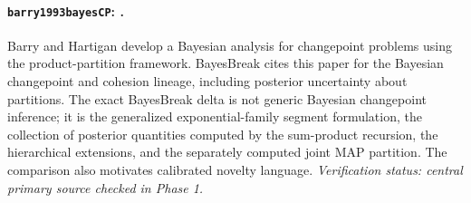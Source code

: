 
\paragraph{\texttt{barry1993bayesCP}: \citet{barry1993bayesCP}.}
Barry and Hartigan develop a Bayesian analysis for changepoint problems using the product-partition framework. BayesBreak cites this paper for the Bayesian changepoint and cohesion lineage, including posterior uncertainty about partitions. The exact BayesBreak delta is not generic Bayesian changepoint inference; it is the generalized exponential-family segment formulation, the collection of posterior quantities computed by the sum-product recursion, the hierarchical extensions, and the separately computed joint MAP partition. The comparison also motivates calibrated novelty language. \textit{Verification status: central primary source checked in Phase 1.}
